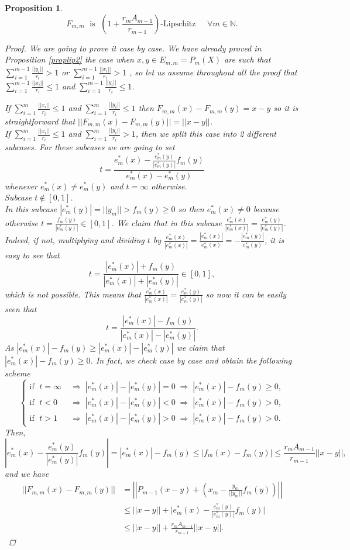 \documentclass[11pt]{amsart}
\newcommand{\N}{\mathbb{N}}
\newcommand{\<}{\langle}
\renewcommand{\>}{\rangle}
\newtheorem{prop}[theorem]{Proposition}
\theoremstyle{definition}
\theoremstyle{remark}
\numberwithin{equation}{section}
\begin{document}
\begin{prop}\label{FDD1D}
$$F_{m,m}\;\text{ is }\;\left(1+\frac{r_mA_{m-1}}{r_{m-1}}\right)\text{-Lipschitz}\;\;\;\;\;\forall m\in \N.$$
\begin{proof}
We are going to prove it case by case. We have already proved in Proposition \ref{proplip2} the case when $x,y\in E_{m,m}=P_m(X)$ are such that $\sum\limits_{i=1}^{m-1}\frac{||y_i||}{r_i}>1$ or $\sum\limits_{i=1}^{m-1}\frac{||x_i||}{r_i}>1$ , so let us assume throughout all the proof that $\sum\limits_{i=1}^{m-1}\frac{||x_i||}{r_i}\le1$ and $\sum\limits_{i=1}^{m-1}\frac{||y_i||}{r_i}\le1$.

If $\sum\limits_{i=1}^{m}\frac{||x_i||}{r_i}\le 1$ and $\sum\limits_{i=1}^{m}\frac{||y_i||}{r_i}\le1$ then $F_{m,m}(x)-F_{m,m}(y)=x-y$ so it is straightforward that $||F_{m,m}(x)-F_{m,m}(y)||=||x-y||$.\\

If $\sum\limits_{i=1}^{m}\frac{||x_i||}{r_i}\le1$ and $\sum\limits_{i=1}^{m}\frac{||y_i||}{r_i}>1$, then we split this case into 2 different subcases. For these subcases we are going to set
$$t=\frac{e_m^*(x)-\frac{e_m^*(y)}{|e_m^*(y)|}f_m(y)}{e_m^*(x)-e_m^*(y)}$$
whenever $e_m^*(x)\neq e_m^*(y)$ and $t=\infty$ otherwise.\\

Subcase $t\notin[0,1]$.\\
In this subcase $|e_m^*(y)|=||y_m||>f_m(y)\ge0$ so then $e^*_m(x)\neq0$ because otherwise $t=\frac{f_m(y)}{|e_m^*(y)|}\in[0,1]$. We claim that in this subcase $\frac{e_m^*(x)}{|e_m^*(x)|}=\frac{e_m^*(y)}{|e_m^*(y)|}$. Indeed, if not, multiplying and dividing $t$ by $\frac{e^*_m(x)}{|e^*_m(x)|}=\frac{|e^*_m(x)|}{e^*_m(x)}=-\frac{|e^*_m(y)|}{e^*_m(y)}$, it is easy to see that
$$t=\frac{|e_m^*(x)|+f_m(y)}{|e_m^*(x)|+|e_m^*(y)|}\in[0,1],$$
which is not possible. This means that $\frac{e_m^*(x)}{|e_m^*(x)|}=\frac{e_m^*(y)}{|e_m^*(y)|}$ so now it can be easily seen that
$$t=\frac{|e_m^*(x)|-f_m(y)}{|e_m^*(x)|-|e_m^*(y)|}.$$
As $|e_m^*(x)|-f_m(y)\ge |e_m^*(x)|-|e_m^*(y)|$ we claim that $|e_m^*(x)|-f_m(y)\ge0$. In fact, we check case by case and obtain the following scheme
$$
\begin{cases}
\text{if }\;t=\infty\;&\Rightarrow\;|e_m^*(x)|-|e_m^*(y)|=0\;\Rightarrow\;|e_m^*(x)|-f_m(y)\ge0,\\
\text{if }\;t<0\;&\Rightarrow\;|e_m^*(x)|-|e_m^*(y)|<0\;\Rightarrow\;|e_m^*(x)|-f_m(y)>0,\\
\text{if }\;t>1\;&\Rightarrow\;|e_m^*(x)|-|e_m^*(y)|>0\;\Rightarrow\;|e_m^*(x)|-f_m(y)>0.
\end{cases}
$$
Then,
$$\left|e_m^*(x)-\frac{e_m^*(y)}{|e_m^*(y)|}f_m(y)\right|=|e_m^*(x)|-f_m(y)\le |f_m(x)-f_m(y)|\le \frac{r_mA_{m-1}}{r_{m-1}}||x-y||,$$
and we have
$$\begin{aligned}||F_{m,m}(x)-F_{m,m}(y)||&=\left|\left|P_{m-1}(x-y)+\left(x_m-\frac{y_m}{||y_m||}f_m(y)\right)\right|\right|\\
&\le||x-y||+\bigg|e_m^*(x)-\frac{e_m^*(y)}{|e_m^*(y)|}f_m(y) \bigg|\\
&\le||x-y||+\frac{r_mA_{m-1}}{r_{m-1}}||x-y||.\end{aligned}$$


\end{proof}
\end{prop}
\end{document}
